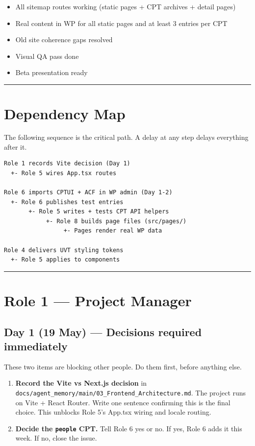 \documentclass[11pt,a4paper]{article}
\newcommand{\grouprule}{\vspace{0.3em}\textcolor{ruleLine}{\rule{\linewidth}{0.4pt}}\vspace{0.3em}}
\begin{document}
\begin{itemize}
\item All sitemap routes working (static pages + CPT archives + detail pages)
\item Real content in WP for all static pages and at least 3 entries per CPT
\item Old site coherence gaps resolved
\item Visual QA pass done
\item Beta presentation ready
\end{itemize}

\grouprule

\section{Dependency Map}

The following sequence is the critical path. A delay at any step delays everything after it.

\begin{lstlisting}
Role 1 records Vite decision (Day 1)
  +- Role 5 wires App.tsx routes

Role 6 imports CPTUI + ACF in WP admin (Day 1-2)
  +- Role 6 publishes test entries
       +- Role 5 writes + tests CPT API helpers
            +- Role 8 builds page files (src/pages/)
                 +- Pages render real WP data

Role 4 delivers UVT styling tokens
  +- Role 5 applies to components
\end{lstlisting}

\grouprule

\section{Role 1 — Project Manager}

\subsection{Day 1 (19 May) — Decisions required immediately}

These two items are blocking other people. Do them first, before anything else.

\begin{enumerate}
\item \textbf{Record the Vite vs Next.js decision} in \nolinkurl{docs/agent_memory/main/03_Frontend_Architecture.md}. The project runs on Vite + React Router. Write one sentence confirming this is the final choice. This unblocks Role 5's App.tsx wiring and locale routing.
\item \textbf{Decide the \nolinkurl{people} CPT.} Tell Role 6 yes or no. If yes, Role 6 adds it this week. If no, close the issue.
\end{enumerate}
\end{document}
